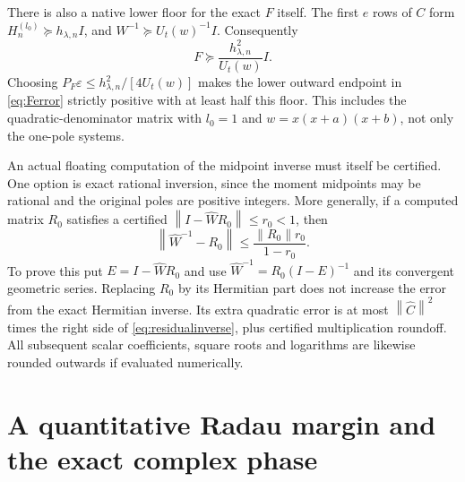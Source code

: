 \documentclass[11pt]{article}
\newcommand{\norm}[1]{\left\lVert#1\right\rVert}
\begin{document}
There is also a native lower floor for the exact $F$ itself. The
first $e$ rows of $C$ form $H_n^{(l_0)}\succeq h_{\lambda,n}I$,
and $W^{-1}\succeq U_t(w)^{-1}I$. Consequently
\begin{equation}\label{eq:Ffloor}
 F\succeq\frac{h_{\lambda,n}^2}{U_t(w)}I.
\end{equation}
Choosing $P_F\varepsilon\le h_{\lambda,n}^2/[4U_t(w)]$
makes the lower outward endpoint in \eqref{eq:Ferror} strictly
positive with at least half this floor. This includes the
quadratic-denominator matrix with $l_0=1$ and
$w=x(x+a)(x+b)$, not only the one-pole systems.

An actual floating computation of the midpoint inverse must itself
be certified. One option is exact rational inversion, since the
moment midpoints may be rational and the original poles are positive
integers. More generally, if a computed matrix $R_0$ satisfies a
certified $\norm{I-\widehat W R_0}\le r_0<1$, then
\begin{equation}\label{eq:residualinverse}
 \norm{\widehat W^{-1}-R_0}
 \le\frac{\norm{R_0}r_0}{1-r_0}.
\end{equation}
To prove this put $E=I-\widehat W R_0$ and use
$\widehat W^{-1}=R_0(I-E)^{-1}$ and its convergent geometric
series. Replacing $R_0$ by its Hermitian part does not increase
the error from the exact Hermitian inverse. Its extra quadratic
error is at most $\norm{\widehat C}^2$ times the right side of
\eqref{eq:residualinverse}, plus certified multiplication roundoff.
All subsequent scalar coefficients, square roots and logarithms are
likewise rounded outwards if evaluated numerically.

\section{A quantitative Radau margin and the exact complex phase}
\end{document}
